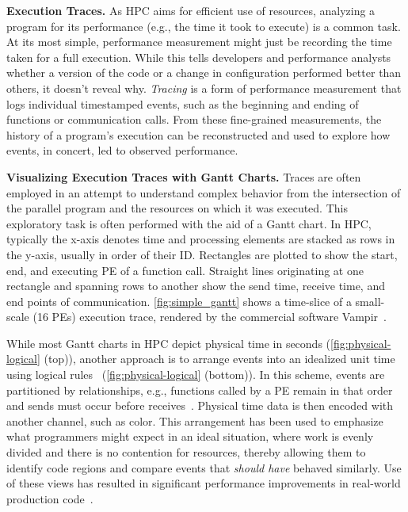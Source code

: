 \vspace{1ex}

\textbf{Execution Traces.} As HPC aims for efficient use of resources, analyzing a program for its performance (e.g., the time it took to execute) is a common task. At its most simple, performance measurement might just be recording the time taken for a full execution. While this tells developers and performance analysts whether a version of the code or a change in configuration performed better than others, it doesn't reveal why. {\em Tracing} is a form of performance measurement that logs individual timestamped events, such as the beginning and ending of functions or communication calls. From these fine-grained measurements, the history of a program's execution can be reconstructed and used to explore how events, in concert, led to observed performance.

\vspace{1ex}

\textbf{Visualizing Execution Traces with Gantt Charts.} Traces are often employed in an attempt to understand complex behavior from the intersection of the parallel program and the resources on which it was executed. This exploratory task is often performed with the aid of a Gantt chart. In HPC, typically the x-axis denotes time and processing elements are stacked as rows in the y-axis, usually in order of their ID. Rectangles are plotted to show the start, end, and executing PE of a function call. Straight lines originating at one rectangle and spanning rows to another show the send time, receive time, and end points of communication. \autoref{fig:simple_gantt} shows a time-slice of a small-scale (16 PEs) execution trace, rendered by the commercial software Vampir~\cite{nagel1996vampir}.

While most Gantt charts in HPC depict physical time in seconds (\autoref{fig:physical-logical} (top)), another approach is to arrange events into an idealized unit time using logical rules~\cite{Leblanc1990, Schaubschlager2003DeWiz, Isaacs2015, Isaacs2016} (\autoref{fig:physical-logical} (bottom)). In this scheme, events are partitioned by relationships, e.g., functions called by a PE remain in that order and sends must occur before receives~\cite{Lamport1978}. Physical time data is then encoded with another channel, such as color. This arrangement has been used to emphasize what programmers might expect in an ideal situation, where work is evenly divided and there is no contention for resources, thereby allowing them to identify code regions and compare events that {\em should have} behaved similarly. Use of these views has resulted in significant performance improvements in real-world production code~\cite{isaacs2014combing}.

